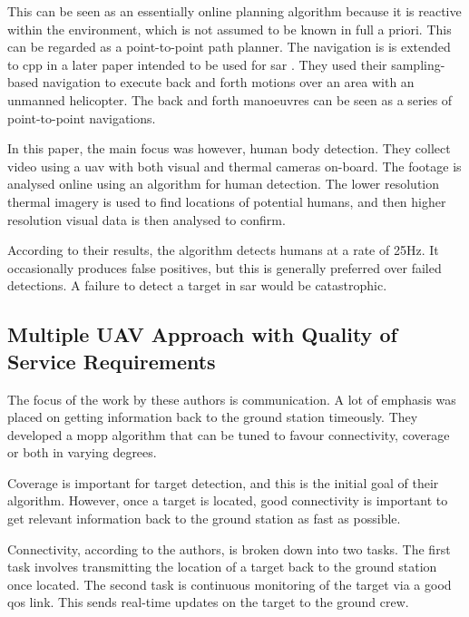 This can be seen as an essentially online planning algorithm because it is reactive within the environment, which is not assumed to be known in full a priori. This can be regarded as a point-to-point path planner. The navigation is is extended to \ac{cpp} in a later paper intended to be used for \ac{sar} \cite{Rudol2008}. They used their sampling-based navigation to execute back and forth motions over an area with an unmanned helicopter. The back and forth manoeuvres can be seen as a series of point-to-point navigations. 

In this paper, the main focus was however, human body detection. They collect video using a \ac{uav} with both visual and thermal cameras on-board. The footage is analysed online using an algorithm for human detection. The lower resolution thermal imagery is used to find locations of potential humans, and then higher resolution visual data is then analysed to confirm. 

According to their results, the algorithm detects humans at a rate of 25Hz. It occasionally produces false positives, but this is generally preferred over failed detections. A failure to detect a target in \acl{sar} would be catastrophic. 

\subsection{Multiple UAV Approach with Quality of Service Requirements}
\label{sec:LR SAR QoS}
The focus of the work by these authors is communication. A lot of emphasis was placed on getting information back to the ground station timeously. They developed a \ac{mopp} algorithm that can be tuned to favour connectivity, coverage or both in varying degrees. \cite{Hayat2020}

Coverage is important for target detection, and this is the initial goal of their algorithm. However, once a target is located, good connectivity is important to get relevant information back to the ground station as fast as possible.

Connectivity, according to the authors, is broken down into two tasks. The first task involves transmitting the location of a target back to the ground station once located. The second task is continuous monitoring of the target via a good \ac{qos} link. This sends real-time updates on the target to the ground crew.


